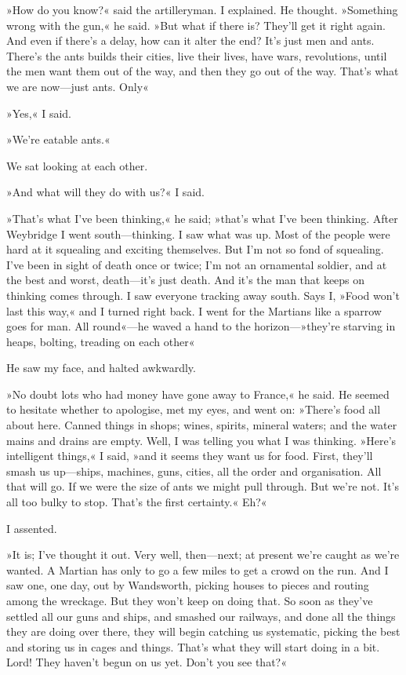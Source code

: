 »How do you know?« said the artilleryman. I explained. He thought. »Something wrong with the gun,« he said. »But what if there is? They'll get it right again. And even if there's a delay, how can it alter the end? It's just men and ants. There's the ants builds their cities, live their lives, have wars, revolutions, until the men want them out of the way, and then they go out of the way. That's what we are now—just ants. Only\longdash«

»Yes,« I said.

»We're eatable ants.«

We sat looking at each other.

»And what will they do with us?« I said.

»That's what I've been thinking,« he said; »that's what I've been thinking. After Weybridge I went south—thinking. I saw what was up. Most of the people were hard at it squealing and exciting themselves. But I'm not so fond of squealing. I've been in sight of death once or twice; I'm not an ornamental soldier, and at the best and worst, death—it's just death. And it's the man that keeps on thinking comes through. I saw everyone tracking away south. Says I, »Food won't last this way,« and I turned right back. I went for the Martians like a sparrow goes for man. All round«—he waved a hand to the horizon—»they're starving in heaps, bolting, treading on each other\textellipsis«

He saw my face, and halted awkwardly.

»No doubt lots who had money have gone away to France,« he said. He seemed to hesitate whether to apologise, met my eyes, and went on: »There's food all about here. Canned things in shops; wines, spirits, mineral waters; and the water mains and drains are empty. Well, I was telling you what I was thinking. »Here's intelligent things,« I said, »and it seems they want us for food. First, they'll smash us up—ships, machines, guns, cities, all the order and organisation. All that will go. If we were the size of ants we might pull through. But we're not. It's all too bulky to stop. That's the first certainty.« Eh?«

I assented.

»It is; I've thought it out. Very well, then—next; at present we're caught as we're wanted. A Martian has only to go a few miles to get a crowd on the run. And I saw one, one day, out by Wandsworth, picking houses to pieces and routing among the wreckage. But they won't keep on doing that. So soon as they've settled all our guns and ships, and smashed our railways, and done all the things they are doing over there, they will begin catching us systematic, picking the best and storing us in cages and things. That's what they will start doing in a bit. Lord! They haven't begun on us yet. Don't you see that?«

